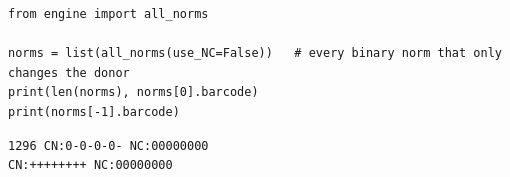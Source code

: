 \begin{lstlisting}[style=code]
from engine import all_norms

norms = list(all_norms(use_NC=False))   # every binary norm that only changes the donor
print(len(norms), norms[0].barcode)
print(norms[-1].barcode)
\end{lstlisting}
\begin{lstlisting}[style=output]
1296 CN:0-0-0-0- NC:00000000
CN:++++++++ NC:00000000
\end{lstlisting}
